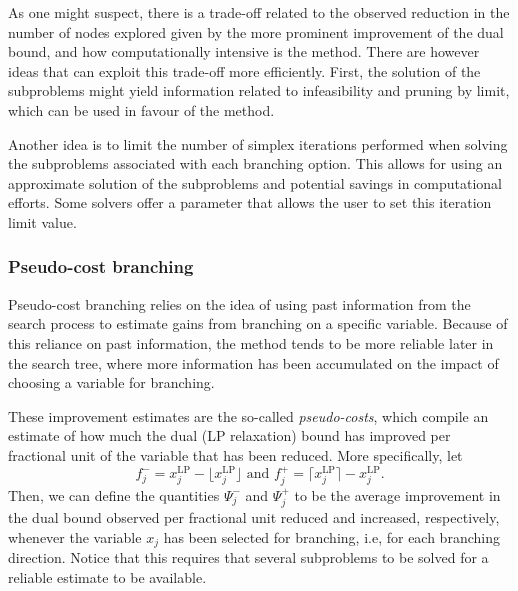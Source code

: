 As one might suspect, there is a trade-off related to the observed reduction in the number of nodes explored given by the more prominent improvement of the dual bound, and how computationally intensive is the method. There are however ideas that can exploit this trade-off more efficiently. First, the solution of the subproblems might yield information related to infeasibility and pruning by limit, which can be used in favour of the method. 

Another idea is to limit the number of simplex iterations performed when solving the subproblems associated with each branching option. This allows for using an approximate solution of the subproblems and potential savings in computational efforts. Some solvers offer a parameter that allows the user to set this iteration limit value.


\subsubsection{Pseudo-cost branching}

Pseudo-cost branching relies on the idea of using past information from the search process to estimate gains from branching on a specific variable. Because of this reliance on past information, the method tends to be more reliable later in the search tree, where more information has been accumulated on the impact of choosing a variable for branching.

These improvement estimates are the so-called \emph{pseudo-costs}, which compile an estimate of how much the dual (LP relaxation) bound has improved per fractional unit of the variable that has been reduced. More specifically, let 
%
\begin{equation} \label{p1c11:eq:fractionals}
	f^{-}_j = x^{\text{LP}}_j - \lfloor x^{\text{LP}}_j \rfloor \text{ and } f^{+}_j = \lceil x^{\text{LP}}_j \rceil - x^{\text{LP}}_j.	
\end{equation}
%
Then, we can define the quantities $\Psi^-_j$ and $\Psi^+_j$ to be the average improvement in the dual bound observed per fractional unit reduced and increased, respectively, whenever the variable $x_j$ has been selected for branching, i.e, for each branching direction. Notice that this requires that several subproblems to be solved for a reliable estimate to be available.

